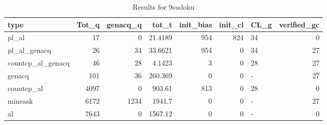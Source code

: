\begin{table}[ht]
\caption{Results for 9sudoku}
\begin{tabular}{lrrrrrlr}
\hline
 type              &   Tot\_q &   genacq\_q &     tot\_t &   init\_bias &   init\_cl & CL\_g   &   verified\_gc \\
\hline
 pl\_al             &      17 &          0 &   21.4189 &         954 &       824 & 34     &             0 \\
 pl\_al\_genacq      &      26 &         34 &   33.6621 &         954 &         0 & 34     &            27 \\
 countcp\_al\_genacq &      46 &         28 &    4.1423 &           3 &         0 & 28     &            27 \\
 genacq            &     101 &         36 &  260.369  &           0 &         0 & -      &            27 \\
 countcp\_al        &    4097 &          0 &  903.61   &         813 &         0 & 28     &             0 \\
 mineask           &    6172 &       1234 & 1941.7    &           0 &         0 & -      &            27 \\
 al                &    7643 &          0 & 1567.12   &           0 &         0 & -      &             0 \\
\hline
\end{tabular}
\end{table}